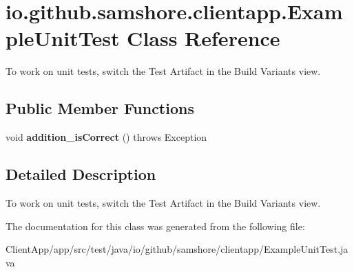 \hypertarget{classio_1_1github_1_1samshore_1_1clientapp_1_1_example_unit_test}{}\section{io.\+github.\+samshore.\+clientapp.\+Example\+Unit\+Test Class Reference}
\label{classio_1_1github_1_1samshore_1_1clientapp_1_1_example_unit_test}


To work on unit tests, switch the Test Artifact in the Build Variants view.  


\subsection*{Public Member Functions}
\begin{DoxyCompactItemize}
\item 
void {\bfseries addition\+\_\+is\+Correct} ()  throws Exception \hypertarget{classio_1_1github_1_1samshore_1_1clientapp_1_1_example_unit_test_a7dda2578c57f518bdec36eaa97ea917b}{}\label{classio_1_1github_1_1samshore_1_1clientapp_1_1_example_unit_test_a7dda2578c57f518bdec36eaa97ea917b}

\end{DoxyCompactItemize}


\subsection{Detailed Description}
To work on unit tests, switch the Test Artifact in the Build Variants view. 

The documentation for this class was generated from the following file\+:\begin{DoxyCompactItemize}
\item 
Client\+App/app/src/test/java/io/github/samshore/clientapp/Example\+Unit\+Test.\+java\end{DoxyCompactItemize}
